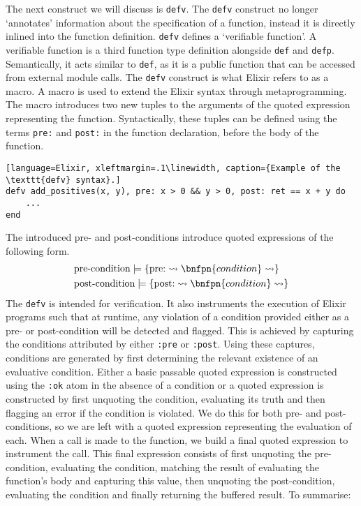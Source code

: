 \par
The next construct we will discuss is \texttt{defv}. The \texttt{defv} construct no longer `annotates' information about the specification of a function, instead it is directly inlined into the function definition. \texttt{defv} defines a `verifiable function'. A verifiable function is a third function type definition alongside \texttt{def} and \texttt{defp}. Semantically, it acts similar to \texttt{def}, as it is a public function that can be accessed from external module calls. The \texttt{defv} construct is what Elixir refers to as a macro. A macro is used to extend the Elixir syntax through metaprogramming. The macro introduces two new tuples to the arguments of the quoted expression representing the function. Syntactically, these tuples can be defined using the terms \texttt{pre:} and \texttt{post:} in the function declaration, before the body of the function.
\begin{lstlisting}[language=Elixir, xleftmargin=.1\linewidth, caption={Example of the \texttt{defv} syntax}.]
defv add_positives(x, y), pre: x > 0 && y > 0, post: ret == x + y do
    ...
end
\end{lstlisting}
The introduced pre- and post-conditions introduce quoted expressions of the following form.
\[
\begin{aligned}
& \text{pre-condition} \models \{\text{pre:} \rightsquigarrow \bnfpn{condition} \rightsquigarrow \} \\
& \text{post-condition} \models \{\text{post:} \rightsquigarrow \bnfpn{condition} \rightsquigarrow \}
\end{aligned}
\]
The \texttt{defv} is intended for verification. It also instruments the execution of Elixir programs such that at runtime, any violation of a condition provided either as a pre- or post-condition will be detected and flagged. This is achieved by capturing the conditions attributed by either \texttt{:pre} or \texttt{:post}. Using these captures, conditions are generated by first determining the relevant existence of an evaluative condition. Either a basic passable quoted expression is constructed using the \texttt{:ok} atom in the absence of a condition or a quoted expression is constructed by first unquoting the condition, evaluating its truth and then flagging an error if the condition is violated. We do this for both pre- and post-conditions, so we are left with a quoted expression representing the evaluation of each. When a call is made to the function, we build a final quoted expression to instrument the call. This final expression consists of first unquoting the pre-condition, evaluating the condition, matching the result of evaluating the function's body and capturing this value, then unquoting the post-condition, evaluating the condition and finally returning the buffered result. To summarise:
